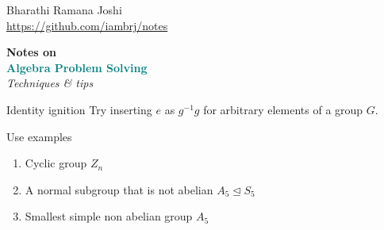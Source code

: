 \documentclass[titlepage, 12pt]{article}
\newcommand*{\logo}{\fbox{$\mathfrak{BRJ}$}}
\begin{document}
\begin{titlepage}

	\raggedleft

	\vspace*{\baselineskip}

	{Bharathi Ramana Joshi\\\url{https://github.com/iambrj/notes}}

	\vspace*{0.167\textheight}

	\textbf{\LARGE Notes on}\\[\baselineskip]

	\textbf{\textcolor{teal}{\huge Algebra Problem Solving}}\\[\baselineskip]

    {\Large \textit{Techniques \& tips}}

	\vfill

	{\large \logo}

	\vspace*{3\baselineskip}

\end{titlepage}

\newpage

\begin{technique}{Identity ignition}{}
    Try inserting $e$ as $g^{-1}g$ for arbitrary
    elements of a group $G$.
\end{technique}

\begin{technique}{Use examples}{}
    \begin{enumerate}
        \item Cyclic group $Z_n$
        \item A normal subgroup that is not abelian $A_5\trianglelefteq S_5$
        \item Smallest simple non abelian group $A_5$
    \end{enumerate}
\end{technique}
\end{document}
